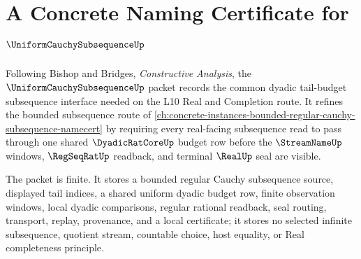 \chapter{A Concrete Naming Certificate for $\UniformCauchySubsequenceUp$}
\label{ch:concrete-instances-uniform-cauchy-subsequence-namecert}

Following Bishop and Bridges, \emph{Constructive Analysis}, the $\UniformCauchySubsequenceUp$ packet records the common dyadic tail-budget subsequence interface needed on the L10 Real and Completion route. It refines the bounded subsequence route of \autoref{ch:concrete-instances-bounded-regular-cauchy-subsequence-namecert} by requiring every real-facing subsequence read to pass through one shared $\DyadicRatCoreUp$ budget row before the $\StreamNameUp$ windows, $\RegSeqRatUp$ readback, and terminal $\RealUp$ seal are visible.

The packet is finite. It stores a bounded regular Cauchy subsequence source, displayed tail indices, a shared uniform dyadic budget row, finite observation windows, local dyadic comparisons, regular rational readback, seal routing, transport, replay, provenance, and a local certificate; it stores no selected infinite subsequence, quotient stream, countable choice, host equality, or Real completeness principle.

